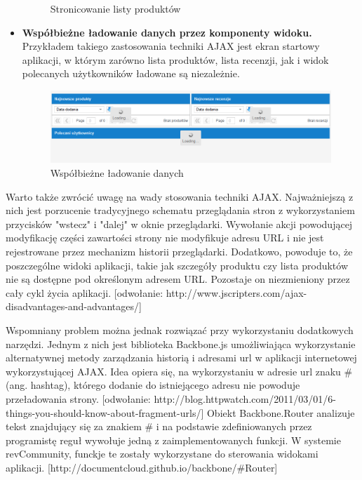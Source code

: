 \begin{itemize}
\begin{figure}[h]
	\caption{Stronicowanie listy produktów}
\end{figure}
\item\textbf{Współbieżne ładowanie danych przez komponenty widoku.} Przykładem takiego zastosowania techniki AJAX jest ekran startowy aplikacji, w którym zarówno lista produktów, lista recenzji, jak i widok polecanych użytkowników ładowane są niezależnie.
\begin{figure}[h]
	\centering
	\includegraphics[scale=0.7]{images/Loading.png}
	\caption{Współbieżne ładowanie danych}
\end{figure}
\end{itemize}


Warto także zwrócić uwagę na wady stosowania techniki AJAX. Najważniejszą z nich jest porzucenie tradycyjnego schematu przeglądania stron z wykorzystaniem przycisków "wstecz" i "dalej" w oknie przeglądarki. Wywołanie akcji powodującej modyfikację części zawartości strony nie modyfikuje adresu URL i nie jest rejestrowane przez mechanizm historii przeglądarki. Dodatkowo, powoduje to, że poszczególne widoki aplikacji, takie jak szczegóły produktu czy lista produktów nie są dostępne pod określonym adresem URL. Pozostaje on niezmieniony przez cały cykl życia aplikacji. [odwołanie: http://www.jscripters.com/ajax-disadvantages-and-advantages/]

Wspomniany problem można jednak rozwiązać przy wykorzystaniu dodatkowych narzędzi. Jednym z nich jest biblioteka Backbone.js umożliwiająca wykorzystanie alternatywnej metody zarządzania historią i adresami url w aplikacji internetowej wykorzystującej AJAX. Idea opiera się, na wykorzystaniu w adresie url znaku \# (ang. hashtag), którego dodanie do istniejącego adresu nie powoduje przeładowania strony. [odwołanie: http://blog.httpwatch.com/2011/03/01/6-things-you-should-know-about-fragment-urls/] Obiekt Backbone.Router analizuje tekst znajdujący się za znakiem \# i na podstawie zdefiniowanych przez programistę reguł wywołuje jedną z zaimplementowanych funkcji. W systemie revCommunity, funckje te zostały wykorzystane do sterowania widokami aplikacji. [http://documentcloud.github.io/backbone/\#Router]

